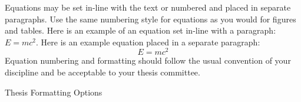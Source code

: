 Equations may be set in-line with the text or numbered and placed in separate
paragraphs.  Use the same numbering style for equations as you would for
figures and tables.  Here is an example of an equation set in-line with a
paragraph: $E = mc^2$.  Here is an example equation placed in a separate
paragraph:
\begin{equation}
E = mc^2
\end{equation}
Equation numbering and formatting should follow the usual convention of
your discipline and be acceptable to your thesis committee.

\newpage
\begin{table}[h]
	\caption{Thesis Formatting Options\label{tab:options}}
	\vspace{0.125in}
	\centering
	

\end{table}
